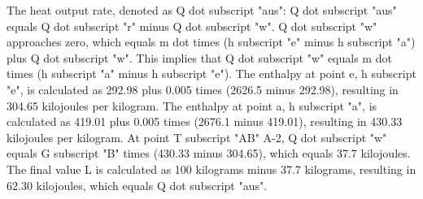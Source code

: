 The heat output rate, denoted as Q dot subscript "aus":
Q dot subscript "aus" equals Q dot subscript "r" minus Q dot subscript "w".
Q dot subscript "w" approaches zero, which equals m dot times (h subscript "e" minus h subscript "a") plus Q dot subscript "w".
This implies that Q dot subscript "w" equals m dot times (h subscript "a" minus h subscript "e").
The enthalpy at point e, h subscript "e", is calculated as 292.98 plus 0.005 times (2626.5 minus 292.98), resulting in 304.65 kilojoules per kilogram.
The enthalpy at point a, h subscript "a", is calculated as 419.01 plus 0.005 times (2676.1 minus 419.01), resulting in 430.33 kilojoules per kilogram.
At point T subscript "AB" A-2, Q dot subscript "w" equals G subscript "B" times (430.33 minus 304.65), which equals 37.7 kilojoules.
The final value L is calculated as 100 kilograms minus 37.7 kilograms, resulting in 62.30 kilojoules, which equals Q dot subscript "aus".